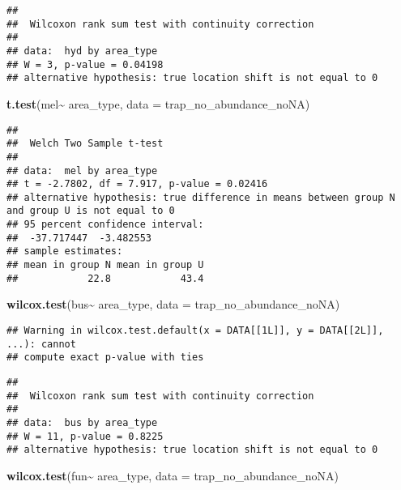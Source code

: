 \documentclass[
]{article}
\newenvironment{Shaded}{\begin{snugshade}}{\end{snugshade}}
\newcommand{\AttributeTok}[1]{\textcolor[rgb]{0.13,0.29,0.53}{#1}}
\newcommand{\FunctionTok}[1]{\textcolor[rgb]{0.13,0.29,0.53}{\textbf{#1}}}
\newcommand{\NormalTok}[1]{#1}
\newcommand{\SpecialCharTok}[1]{\textcolor[rgb]{0.81,0.36,0.00}{\textbf{#1}}}
\begin{document}
\begin{verbatim}
## 
##  Wilcoxon rank sum test with continuity correction
## 
## data:  hyd by area_type
## W = 3, p-value = 0.04198
## alternative hypothesis: true location shift is not equal to 0
\end{verbatim}

\begin{Shaded}
\begin{Highlighting}[]
\FunctionTok{t.test}\NormalTok{(mel}\SpecialCharTok{\textasciitilde{}}\NormalTok{ area\_type, }\AttributeTok{data =}\NormalTok{ trap\_no\_abundance\_noNA)}
\end{Highlighting}
\end{Shaded}

\begin{verbatim}
## 
##  Welch Two Sample t-test
## 
## data:  mel by area_type
## t = -2.7802, df = 7.917, p-value = 0.02416
## alternative hypothesis: true difference in means between group N and group U is not equal to 0
## 95 percent confidence interval:
##  -37.717447  -3.482553
## sample estimates:
## mean in group N mean in group U 
##            22.8            43.4
\end{verbatim}

\begin{Shaded}
\begin{Highlighting}[]
\FunctionTok{wilcox.test}\NormalTok{(bus}\SpecialCharTok{\textasciitilde{}}\NormalTok{ area\_type, }\AttributeTok{data =}\NormalTok{ trap\_no\_abundance\_noNA)}
\end{Highlighting}
\end{Shaded}

\begin{verbatim}
## Warning in wilcox.test.default(x = DATA[[1L]], y = DATA[[2L]], ...): cannot
## compute exact p-value with ties
\end{verbatim}

\begin{verbatim}
## 
##  Wilcoxon rank sum test with continuity correction
## 
## data:  bus by area_type
## W = 11, p-value = 0.8225
## alternative hypothesis: true location shift is not equal to 0
\end{verbatim}

\begin{Shaded}
\begin{Highlighting}[]
\FunctionTok{wilcox.test}\NormalTok{(fun}\SpecialCharTok{\textasciitilde{}}\NormalTok{ area\_type, }\AttributeTok{data =}\NormalTok{ trap\_no\_abundance\_noNA)}
\end{Highlighting}
\end{Shaded}
\end{document}
